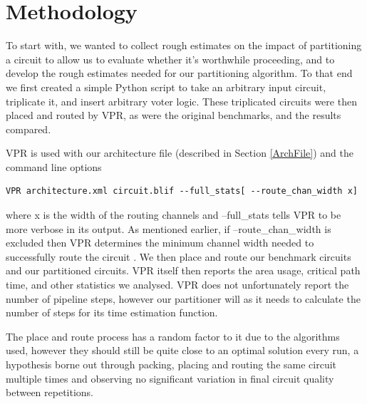 \documentclass[12pt,drafta4paper,oneside]{memoir} %
\begin{document}

\section{Methodology}\label{BenchmarkMethod}
To start with, we wanted to collect rough estimates on the impact of partitioning a circuit to allow us to evaluate whether it's worthwhile proceeding, and to develop the rough estimates needed for our partitioning algorithm. To that end we first created a simple Python script to take an arbitrary input circuit, triplicate it, and insert arbitrary voter logic. These triplicated circuits were then placed and routed by \ac{VPR}, as were the original benchmarks, and the results compared.

\ac{VPR} is used with our architecture file (described in Section \ref{ArchFile}) and the command line options 
\begin{lstlisting}
VPR architecture.xml circuit.blif --full_stats[ --route_chan_width x]
\end{lstlisting} where x is the width of the routing channels and --full\_stats tells \ac{VPR} to be more verbose in its output.
As mentioned earlier, if --route\_chan\_width is excluded then \ac{VPR} determines the minimum channel width needed to successfully route the circuit \cite{VPRManual}. We then place and route our benchmark circuits and our partitioned circuits. \ac{VPR} itself then reports the area usage, critical path time, and other statistics we analysed. \ac{VPR} does not unfortunately report the number of pipeline steps, however our partitioner will as it needs to calculate the number of steps for its time estimation function.

The place and route process has a random factor to it due to the algorithms used, however they should still be quite close to an optimal solution every run, a hypothesis borne out through packing, placing and routing the same circuit multiple times and observing no significant variation in final circuit quality between repetitions.
\end{document}
